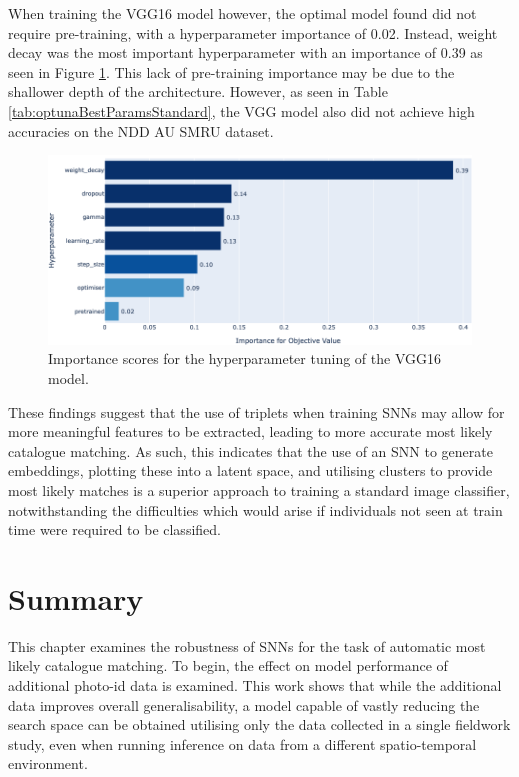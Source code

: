 When training the VGG16 model however, the optimal model found did not require pre-training, with a hyperparameter importance of 0.02. Instead, weight decay was the most important hyperparameter with an importance of 0.39 as seen in Figure \ref{fig:vgg16baseline-hyperparam-importance-optuna}. This lack of pre-training importance may be due to the shallower depth of the architecture. However, as seen in Table \ref{tab:optunaBestParamsStandard}, the VGG model also did not achieve high accuracies on the NDD AU SMRU dataset. 

\begin{figure}
	\begin{center}
		\includegraphics[scale=0.4]{Chapter6/figs/vgg16-baseline-hyperparam-importance-optuna.png}
	\end{center}
	\caption{Importance scores for the hyperparameter tuning of the VGG16 model.}
	\label{fig:vgg16baseline-hyperparam-importance-optuna}
\end{figure}

These findings suggest that the use of triplets when training SNNs may allow for more meaningful features to be extracted, leading to more accurate most likely catalogue matching. As such, this indicates that the use of an SNN to generate embeddings, plotting these into a latent space, and utilising clusters to provide most likely matches is a superior approach to training a standard image classifier, notwithstanding the difficulties which would arise if individuals not seen at train time were required to be classified.

\section{Summary}\label{ch:SNNEvaluation,sec:Summary}

This chapter examines the robustness of SNNs for the task of automatic most likely catalogue matching. To begin, the effect on model performance of additional photo-id data is examined. This work shows that while the additional data improves overall generalisability, a model capable of vastly reducing the search space can be obtained utilising only the data collected in a single fieldwork study, even when running inference on data from a different spatio-temporal environment.

